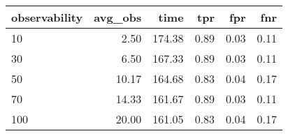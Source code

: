 \begin{tabular}{lrrrrr}
\toprule
observability & avg_obs & time & tpr & fpr & fnr \\
\midrule
10 & 2.50 & 174.38 & 0.89 & 0.03 & 0.11 \\
30 & 6.50 & 167.33 & 0.89 & 0.03 & 0.11 \\
50 & 10.17 & 164.68 & 0.83 & 0.04 & 0.17 \\
70 & 14.33 & 161.67 & 0.89 & 0.03 & 0.11 \\
100 & 20.00 & 161.05 & 0.83 & 0.04 & 0.17 \\
\bottomrule
\end{tabular}
